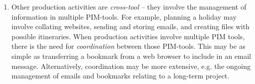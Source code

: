 \begin{enumerate}
\item Other production activities are \textit{cross-tool} -- they involve the management of information in multiple PIM-tools.  For example, planning a holiday may involve collating websites, sending and storing emails, and creating files with possible itineraries.
%
When production activities involve multiple PIM tools, there is the need for \textit{coordination} between those PIM-tools.  This may be as simple as transferring a bookmark from a web browser to include in an email message.  Alternatively, coordination may be more extensive, e.g. the ongoing management of emails and bookmarks relating to a long-term project. 

\end{enumerate}
